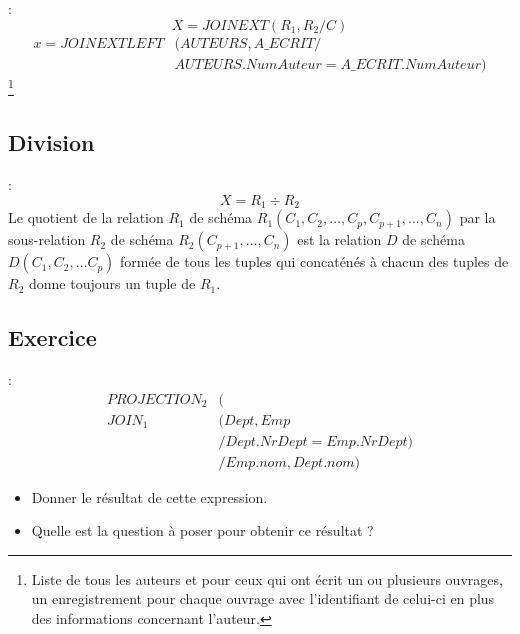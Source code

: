 \documentclass[10pt]{beamer}
\begin{document}
\begin{frame}{\secname : \subsecname}
    $$
        X = JOIN EXT(R_1,R_2 / C)
    $$
    \begin{equation}
        \begin{split}
            x = JOIN EXT LEFT &(AUTEURS, A\_ECRIT  / \\
            & AUTEURS.NumAuteur = A\_ECRIT.NumAuteur)
        \end{split}
    \end{equation}
    \footnote{Liste de tous les auteurs et pour ceux qui ont écrit un ou plusieurs ouvrages, un enregistrement pour chaque ouvrage avec l'identifiant de celui-ci en plus des informations concernant l'auteur.}
\end{frame}
\subsection{Division}
\begin{frame}{\secname : \subsecname}
    $$
        X = R_1 \div R_2
    $$
    Le quotient de la relation $R_1$ de schéma $R_1 (C_1, C_2, …, C_p, C_{p+1}, …, C_n)$ par la sous-relation $R_2$ de schéma $R_2 (C_{p+1}, … , C_n)$ est la relation $D$ de schéma $D (C_1, C_2, … C_p)$ formée de tous les tuples qui concaténés à chacun des tuples de $R_2$ donne toujours un tuple de $R_1$.

\end{frame}
\subsection{Exercice}
\begin{frame}{\secname : \subsecname}
    \begin{equation}
        \begin{split}
            PROJECTION_2 &( \\
            JOIN_1 &(Dept, Emp \\
            & / Dept.NrDept = Emp.NrDept) \\
            & / Emp.nom, Dept.nom  )
        \end{split}
    \end{equation}
    \begin{itemize}
        \item Donner le résultat de cette expression.
        \item Quelle est la question à poser pour obtenir ce résultat ?
    \end{itemize}

\end{frame}
\end{document}
